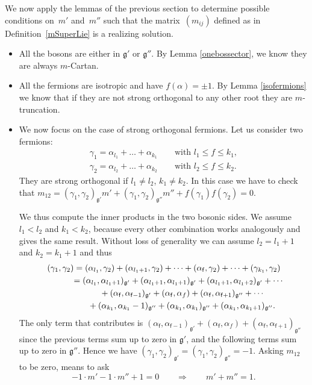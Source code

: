 \documentclass[10pt,a4paper]{amsart}
\numberwithin{equation}{section}
\newcommand{\g}{\mathfrak{g}}
\newcommand{\f}{\mathsf{f}}
\begin{document}
We now apply the lemmas of the previous section to determine possible conditions on~$m'$ and~$m''$ such that the matrix~$(m_{ij})$ defined as in Definition~\ref{mSuperLie} is a realizing solution.
\begin{itemize}\itemsep=0pt
	\item All the bosons are either in $\mathfrak{g'}$ or $\mathfrak{g''}$. By Lemma \ref{onebossector}, we know they are always $m$-Cartan.
	\item All the fermions are isotropic and have $f(\alpha)= \pm 1$. By Lemma \ref{isofermions} we know that if they are not strong orthogonal to any other root they are $m$-truncation.
	\item We now focus on the case of strong orthogonal fermions. Let us consider two fermions:
\begin{gather*}
\gamma_1 = \alpha_{l_1}+ \dots + \alpha_{k_1} \qquad \text{with }  l_1\leq f \leq k_1, \\
\gamma_2 = \alpha_{l_2}+ \dots + \alpha_{k_2} \qquad \text{with }  l_2\leq f \leq k_2.
\end{gather*}	
	They are strong orthogonal if $l_1 \neq l_2$, $k_1 \neq k_2$.
	In this case we have to check that $m_{12}=(\gamma_1, \gamma_2)_\mathfrak{g'}m' + (\gamma_1, \gamma_2)_\mathfrak{g''}m'' + f(\gamma_1)f(\gamma_2) =0$.

	We thus compute the inner products in the two bosonic sides. We assume $l_1 < l_2$ and $k_1 < k_2$, because every other combination works analogously and gives the same result. Without loss of generality we can assume $l_2 = l_1+1$ and $k_2 = k_1+1$ and thus
\begin{gather*}
(\gamma_1, \gamma_2) = (\alpha_{l_1}, \gamma_2) + ( \alpha_{l_1+1}, \gamma_2) + \dots + (\alpha_\f, \gamma_2) + \dots + (\gamma_{k_1}, \gamma_2)\\
\hphantom{(\gamma_1, \gamma_2)}{}
= (\alpha_{l_1}, \alpha_{l_1+1})_\mathfrak{g'}
							 + ( \alpha_{l_1+1}, \alpha_{l_1+1})_\mathfrak{g'} + ( \alpha_{l_1+1}, \alpha_{l_1+2})_\mathfrak{g'}
							 + \cdots \\
\hphantom{(\gamma_1, \gamma_2)=}{}
							 +(\alpha_\f, \alpha_{\f-1})_\mathfrak{g'} + (\alpha_\f, \alpha_{f}) + (\alpha_\f, \alpha_{\f+1})_\mathfrak{g''}
							 +\cdots\\
\hphantom{(\gamma_1, \gamma_2)=}{}
+(\alpha_{k_1}, \alpha_{k_1}-1)_\mathfrak{g''} + (\alpha_{k_1},\alpha_{k_1})_\mathfrak{g''}+ (\alpha_{k_1}, \alpha_{k_1+1})_\mathfrak{g''}	.				
		\end{gather*}				
		The only term that contributes is $(\alpha_\f, \alpha_{\f-1})_\mathfrak{g'} + (\alpha_\f, \alpha_{f}) + (\alpha_\f, \alpha_{\f+1})_\mathfrak{g''}$ since the previous terms sum up to zero in $\mathfrak{g'}$, and the following terms sum up to zero in $\mathfrak{g''}$. Hence we have
		$(\gamma_1, \gamma_2)_{\g'}= (\gamma_1, \gamma_2)_{\g''}= -1.$
		Asking $m_{12}$ to be zero, means to ask \[-1 \cdot m' -1\cdot m'' + 1 = 0 \qquad \Rightarrow \qquad m' + m'' = 1.\]
\end{itemize}
\end{document}
